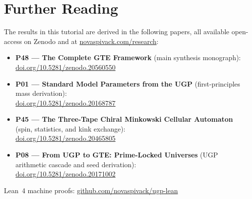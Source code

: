 \documentclass[11pt,a4paper]{article}
\begin{document}
\section*{Further Reading}
\begin{tcolorbox}[colback=orange!8,colframe=orange!50!black,
  title=\textbf{Primary Sources}]
The results in this tutorial are derived in the following papers,
all available open-access on Zenodo and at
\href{https://novaspivack.com/research}{novaspivack.com/research}:
\begin{itemize}[itemsep=2pt]
  \item \textbf{P48 --- The Complete GTE Framework} (main synthesis monograph):\\
        \href{https://doi.org/10.5281/zenodo.20560550}{doi.org/10.5281/zenodo.20560550}
  \item \textbf{P01 --- Standard Model Parameters from the UGP}
        (first-principles mass derivation):\\
        \href{https://doi.org/10.5281/zenodo.20168787}{doi.org/10.5281/zenodo.20168787}
  \item \textbf{P45 --- The Three-Tape Chiral Minkowski Cellular Automaton}
        (spin, statistics, and kink exchange):\\
        \href{https://doi.org/10.5281/zenodo.20465805}{doi.org/10.5281/zenodo.20465805}
  \item \textbf{P08 --- From UGP to GTE: Prime-Locked Universes}
        (UGP arithmetic cascade and seed derivation):\\
        \href{https://doi.org/10.5281/zenodo.20171002}{doi.org/10.5281/zenodo.20171002}
\end{itemize}
Lean~4 machine proofs:
\href{https://github.com/novaspivack/ugp-lean}{github.com/novaspivack/ugp-lean}
\end{tcolorbox}


\end{document}
